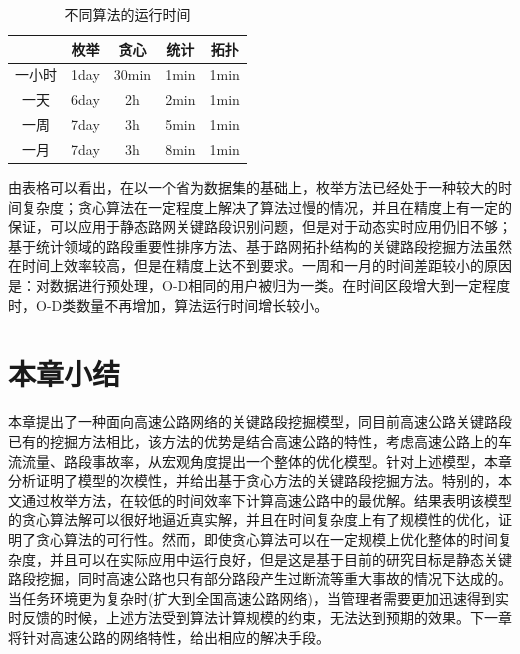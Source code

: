 				\begin{table}[h]
				\centering
				\begin{tabular}{|c|c|c|c|c|}
				\hline
				\hline
				   &   枚举 &   贪心 &   统计 &   拓扑 \\
				\hline
				  一小时 &   1day &   30min &   1min &   1min \\
				\hline
				  一天 &   6day &   2h &   2min &   1min \\
				\hline
				  一周 &   7day &   3h &   5min &   1min \\
				\hline
				  一月 &   7day &   3h &   8min &   1min \\
				\hline
				\end{tabular}
				\caption{不同算法的运行时间}
				\label{table1}
				\end{table} 

				由表格可以看出，在以一个省为数据集的基础上，枚举方法已经处于一种较大的时间复杂度；贪心算法在一定程度上解决了算法过慢的情况，并且在精度上有一定的保证，可以应用于静态路网关键路段识别问题，但是对于动态实时应用仍旧不够；基于统计领域的路段重要性排序方法、基于路网拓扑结构的关键路段挖掘方法虽然在时间上效率较高，但是在精度上达不到要求。一周和一月的时间差距较小的原因是：对数据进行预处理，O-D相同的用户被归为一类。在时间区段增大到一定程度时，O-D类数量不再增加，算法运行时间增长较小。

		\section{本章小结}
			本章提出了一种面向高速公路网络的关键路段挖掘模型，同目前高速公路关键路段已有的挖掘方法相比，该方法的优势是结合高速公路的特性，考虑高速公路上的车流流量、路段事故率，从宏观角度提出一个整体的优化模型。针对上述模型，本章分析证明了模型的次模性，并给出基于贪心方法的关键路段挖掘方法。特别的，本文通过枚举方法，在较低的时间效率下计算高速公路中的最优解。结果表明该模型的贪心算法解可以很好地逼近真实解，并且在时间复杂度上有了规模性的优化，证明了贪心算法的可行性。然而，即使贪心算法可以在一定规模上优化整体的时间复杂度，并且可以在实际应用中运行良好，但是这是基于目前的研究目标是静态关键路段挖掘，同时高速公路也只有部分路段产生过断流等重大事故的情况下达成的。当任务环境更为复杂时(扩大到全国高速公路网络)，当管理者需要更加迅速得到实时反馈的时候，上述方法受到算法计算规模的约束，无法达到预期的效果。下一章将针对高速公路的网络特性，给出相应的解决手段。





			
